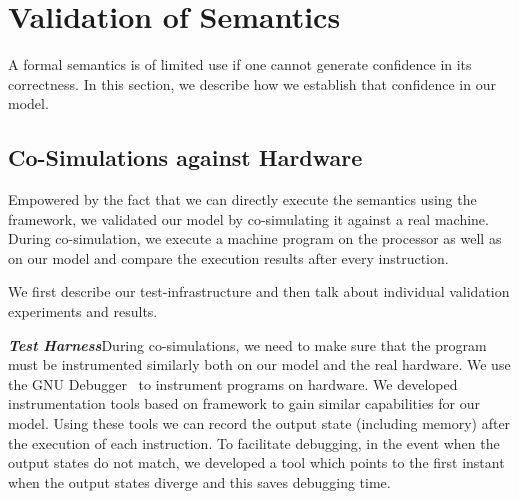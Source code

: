 \section{Validation of Semantics} \label{sec:Eval}

A formal semantics is of limited use if one cannot generate confidence in its correctness. In this section, we describe how we establish that confidence in our model. 




\subsection{Co-Simulations against Hardware}
Empowered by the fact that we can directly execute the semantics using the \K framework,  we validated our model by  co-simulating  it against a real machine. During co-simulation, we execute a machine program on the processor as well as on our \K model and compare the execution results after every instruction. 

We first describe our test-infrastructure and then talk about individual validation experiments and results.


\vspace{2pt}
\noindent\textbf{\emph{Test Harness}}\;\;During co-simulations, we need to make sure that the program must be instrumented similarly both on our model and the real hardware. We use the GNU Debugger~\cite{GDB} to instrument programs on hardware. We developed instrumentation tools based on \K framework to gain similar capabilities for our model. Using these tools we can record the output state (including memory) after the execution of each instruction. 
To facilitate debugging, in the event when the output states do not match, we developed a tool which points to the first instant when the output states diverge and this saves debugging time. 

